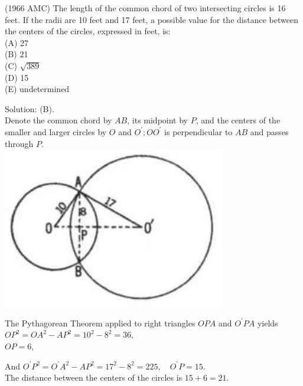 \documentclass{article}
\begin{document}
(1966 AMC) The length of the common chord of two intersecting circles is 16 feet. If the radii are 10 feet and 17 feet, a possible value for the distance between the centers of the circles, expressed in feet, is:\\
(A) 27\\
(B) 21\\
(C) \(\sqrt{389}\)\\
(D) 15\\
(E) undetermined

Solution: (B).\\
Denote the common chord by \(A B\), its midpoint by \(P\), and the centers of the smaller and larger circles by \(O\) and \(O^{\prime} ; O O^{\prime}\) is perpendicular to \(A B\) and passes through \(P\).\\
\centering
\includegraphics[width=\textwidth]{images/177(1).jpg}

The Pythagorean Theorem applied to right triangles \(O P A\) and \(O^{\prime} P A\) yields \(O P^{2}=O A^{2}-A P^{2}=10^{2}-8^{2}=36\),\\
\(O P=6\),


And \(O^{\prime} P^{2}=O^{\prime} A^{2}-A P^{2}=17^{2}-8^{2}=225, \quad O^{\prime} P=15\).\\
The distance between the centers of the circles is \(15+6=21\).
\end{document}
